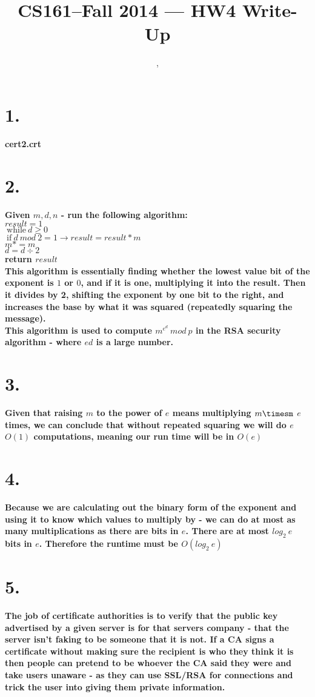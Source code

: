 \documentclass[11pt]{article}
\title{CS161--Fall 2014 --- HW4 Write-Up}
\author{\Name, \texttt{\Login}}
\begin{document}
\maketitle

\section*{1.}
\textbf{cert2.crt}
\section*{2.}
\textbf{Given $m,d,n$ - run the following algorithm:\\
$result = 1$\\
$\ \text{while} \ d \geq 0$ \\ 
$\ \text{if} \ d\ mod\ 2=1 \rightarrow result = result * m$ \\
$m *= m$ \\
$d =d \div 2$ \\
return $result$ \\[3pt]
This algorithm is essentially finding whether the lowest value bit of the exponent is $1$ or $0$, and if it is one, multiplying it into the result. Then it divides by 2, shifting the exponent by one bit to the right, and increases the base by what it was squared (repeatedly squaring the message).\\
This algorithm is used to compute $m^e^d \ mod\ p$ in the RSA security algorithm - where $ed$ is a large number.
}

\section*{3.}
\textbf{Given that raising $m$ to the power of $e$ means multiplying $m\timesm$ $e$ times, we can conclude that without repeated squaring we will do $e$ $O(1)$ computations, meaning our run time will be in $O(e)$}
\section*{4.}
\textbf{Because we are calculating out the binary form of the exponent and using it to know which values to multiply by - we can do at most as many multiplications as there are bits in $e$. There are at most $log_2\ e$ bits in $e$. Therefore the runtime must be $O(log_2\ e)$}
\section*{5.}
\textbf{The job of certificate authorities is to verify that the public key advertised by a given server is for that servers company - that the server isn't faking to be someone that it is not. If a CA signs a certificate without making sure the recipient is who they think it is then people can pretend to be whoever the CA said they were and take users unaware - as they can use SSL/RSA for connections and trick the user into giving them private information.}
\end{document}
